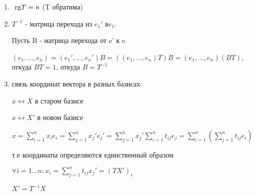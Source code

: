 \begin{enumerate}
    \item \(\rg T = n\) (T обратима)


    \item \(T^{-1}\) - матрица перехода из \(e_1'\) в\(e_1\).

          Пусть B - матрица перехода от e' к e.

          \((e_1,\ldots,e_n) = (e_1',\ldots,e_n')B = ((e_1,\ldots,e_n)T)B = (e_1,\ldots,e_n) (BT)\), откуда \(BT = 1\),  откуда  \(B = T^{-1}\)


    \item связь координат вектора в разных базисах:

          \(x \leftrightarrow X\) в старом базисе

          \(x \leftrightarrow X'\) в новом базисе

          \(x = \sum\limits_{i=1}^n x_i e_i  = \sum \limits_{j=1}^n  x_j'e_j' = \sum\limits_{j=1}^n x_j' \sum\limits_{i=1}^n t_{ij} e_j = \sum\limits_{i=1}^n (\sum\limits_{j=1}^n t_{ij} e_i)\)

          т.е координаты определяются единственный образом

          \(\forall i = 1\ldots n: x_i =\sum\limits_{j=1}^n t_{ij} x_j' = (TX')_i\)

          \(X' = T^{-1} X\)
\end{enumerate}
